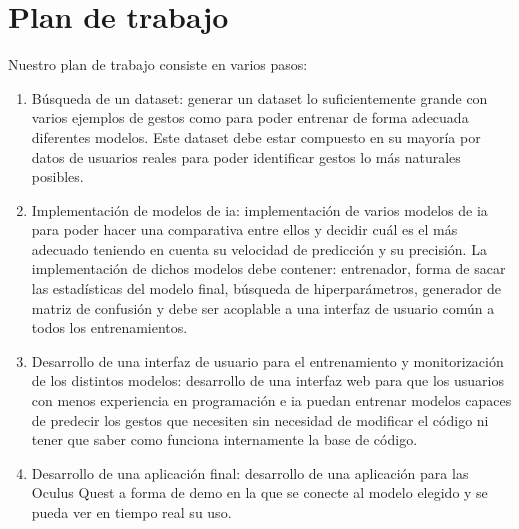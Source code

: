 \section{Plan de trabajo}
Nuestro plan de trabajo consiste en varios pasos:
\begin{enumerate}
	\item Búsqueda de un dataset: generar un dataset lo suficientemente grande con varios ejemplos de gestos como para poder entrenar de forma adecuada diferentes modelos. Este dataset debe estar compuesto en su mayoría por datos de usuarios reales para poder identificar gestos lo más naturales posibles.
	\item Implementación de modelos de \gls{ia}: implementación de varios modelos de \gls{ia} para poder hacer una comparativa entre ellos y decidir cuál es el más adecuado teniendo en cuenta su velocidad de predicción y su precisión. La implementación de dichos modelos debe contener: entrenador, forma de sacar las estadísticas del modelo final, búsqueda de hiperparámetros, generador de matriz de confusión y debe ser acoplable a una interfaz de usuario común a todos los entrenamientos.
	\item Desarrollo de una interfaz de usuario para el entrenamiento y monitorización de los distintos modelos: desarrollo de una interfaz web para que los usuarios con menos experiencia en programación e \gls{ia} puedan entrenar modelos capaces de predecir los gestos que necesiten sin necesidad de modificar el código ni tener que saber como funciona internamente la base de código.
	\item Desarrollo de una aplicación final: desarrollo de una aplicación para las Oculus Quest a forma de demo en la que se conecte al modelo elegido y se pueda ver en tiempo real su uso.
\end{enumerate}
